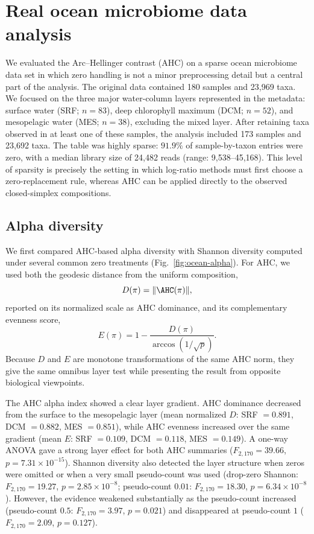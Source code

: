 \section*{Real ocean microbiome data analysis}

We evaluated the Arc--Hellinger contrast (AHC) on a sparse ocean microbiome data set in which zero handling is not a minor preprocessing detail but a central part of the analysis. The original data contained 180 samples and 23,969 taxa. We focused on the three major water-column layers represented in the metadata: surface water (SRF; $n=83$), deep chlorophyll maximum (DCM; $n=52$), and mesopelagic water (MES; $n=38$), excluding the mixed layer. After retaining taxa observed in at least one of these samples, the analysis included 173 samples and 23,692 taxa. The table was highly sparse: $91.9\%$ of sample-by-taxon entries were zero, with a median library size of 24,482 reads (range: 9,538--45,168). This level of sparsity is precisely the setting in which log-ratio methods must first choose a zero-replacement rule, whereas AHC can be applied directly to the observed closed-simplex compositions.

\subsection*{Alpha diversity}

We first compared AHC-based alpha diversity with Shannon diversity computed under several common zero treatments (Fig.~\ref{fig:ocean-alpha}). For AHC, we used both the geodesic distance from the uniform composition,
\[
D(\pi)=\|\AHC(\pi)\|,
\]
reported on its normalized scale as AHC dominance, and its complementary evenness score,
\[
E(\pi)=1-\frac{D(\pi)}{\arccos(1/\sqrt{p})}.
\]
Because $D$ and $E$ are monotone transformations of the same AHC norm, they give the same omnibus layer test while presenting the result from opposite biological viewpoints.

The AHC alpha index showed a clear layer gradient. AHC dominance decreased from the surface to the mesopelagic layer (mean normalized $D$: SRF $=0.891$, DCM $=0.882$, MES $=0.851$), while AHC evenness increased over the same gradient (mean $E$: SRF $=0.109$, DCM $=0.118$, MES $=0.149$). A one-way ANOVA gave a strong layer effect for both AHC summaries ($F_{2,170}=39.66$, $p=7.31\times 10^{-15}$). Shannon diversity also detected the layer structure when zeros were omitted or when a very small pseudo-count was used (drop-zero Shannon: $F_{2,170}=19.27$, $p=2.85\times 10^{-8}$; pseudo-count $0.01$: $F_{2,170}=18.30$, $p=6.34\times 10^{-8}$). However, the evidence weakened substantially as the pseudo-count increased (pseudo-count $0.5$: $F_{2,170}=3.97$, $p=0.021$) and disappeared at pseudo-count $1$ ($F_{2,170}=2.09$, $p=0.127$).

